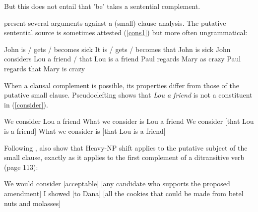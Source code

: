 \documentclass[output=paper]{langsci/langscibook}
\begin{document}
But this does not entail that 'be' takes a sentential complement. 




\citep[Ch.3]{PollardandSag1994} present several arguments against a (small) clause analysis. The putative sentential source is sometimes attested (\ref{cons1}) but more often ungrammatical:

	
\begin{exe}
\ex \begin{xlist}
\ex John is / gets / becomes sick
\ex *It is / gets / becomes that John is sick
\ex \label{cons1} John considers Lou a friend / that Lou is a friend 
\ex 	Paul regards Mary as crazy	
\ex *Paul regards that Mary is crazy
\end{xlist}	

\end{exe}

	
When a clausal complement is possible, its properties differ from those of the putative small clause. Pseudoclefting shows that \textit{Lou a friend} is not a constituent in (\ref{consider}).

\begin{exe}
\ex \begin{xlist}
\ex 	We consider Lou a friend	\label{consider}
\ex  *What we consider is Lou a friend
\ex We consider [that Lou is a friend]
\ex 	What we consider is [that Lou is a friend]
\end{xlist}

\end{exe}

Following \citet{Bresnan1982}, \citet[113]{PollardandSag1994} also show that Heavy-NP shift applies to the putative subject of the small clause, exactly as it applies to the first complement of a ditransitive verb (page 113):

\begin{exe}
\ex \begin{xlist}
\ex   We would consider [acceptable]  [any candidate who supports the proposed amendment]  
\ex   I showed [to Dana]  [all the cookies that could be made from betel nuts and molasses]  
\end{xlist}

\end{exe}
\end{document}

